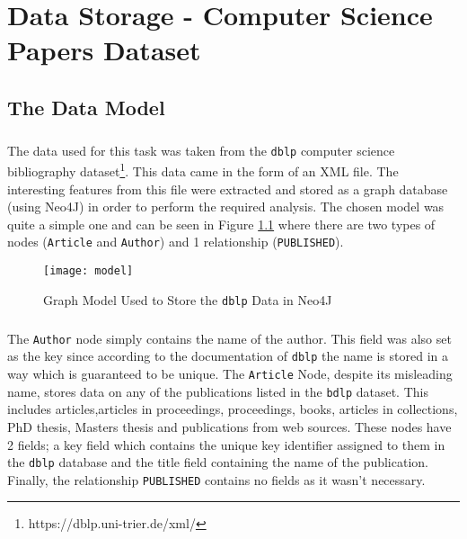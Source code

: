 \chapter{Data Storage - Computer Science Papers Dataset}

\section{The Data Model}
\paragraph{ }The data used for this task was taken from the \texttt{dblp} computer science bibliography dataset\footnote{https://dblp.uni-trier.de/xml/}. This data came in the form of an XML file. The interesting features from this file were extracted and stored as a graph database (using Neo4J) in order to perform the required analysis. The chosen model was quite a simple one and can be seen in Figure \ref{fig::model} where there are two types of nodes (\texttt{Article} and \texttt{Author}) and 1 relationship (\texttt{PUBLISHED}).

\begin{figure}[!b]
	\centering
	\texttt{[image: model]}
	\caption[Neo4J Model]{Graph Model Used to Store the \texttt{dblp} Data in Neo4J}
	\label{fig::model}
\end{figure}

\paragraph{ }The \texttt{Author} node simply contains the name of the author. This field was also set as the key since according to the documentation of \texttt{dblp} the name is stored in a way which is guaranteed to be unique. The \texttt{Article} Node, despite its misleading name, stores data on any of the publications listed in the \texttt{bdlp} dataset. This includes articles,articles in proceedings, proceedings, books, articles in collections, PhD thesis, Masters thesis and publications from web sources. These nodes have 2 fields; a key field which contains the unique key identifier assigned to them in the \texttt{dblp} database and the title field containing the name of the publication. Finally, the relationship \texttt{PUBLISHED} contains no fields as it wasn't necessary.

